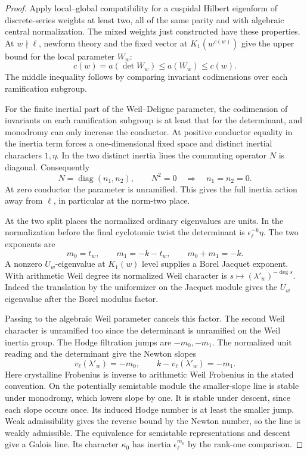 \begin{proof}
Apply local--global compatibility for a cuspidal Hilbert
eigenform of discrete-series weights at least two, all of
the same parity and with algebraic central normalization.
The mixed weights just constructed have these properties.
At \(w\nmid\ell\), newform theory and the fixed vector at
\(K_1(w^{c(w)})\) give the upper bound for the local parameter
\(W_w\):
\[
               c(w)=a(\det W_w)\le a(W_w)\le c(w).
\]
The middle inequality follows by comparing invariant
codimensions over each ramification subgroup.

For the finite inertial part of the
Weil--Deligne parameter, the codimension of invariants on
each ramification subgroup is at least that for the
determinant, and monodromy can only increase the
conductor. At positive conductor equality in the inertia
term forces a one-dimensional fixed space and distinct
inertial characters \(1,\eta\). In the two distinct inertia lines the commuting operator \(N\) is diagonal. Consequently
\[
 N=\operatorname{diag}(n_1,n_2),\qquad N^2=0
 \quad\Longrightarrow\quad n_1=n_2=0 .
\] At zero conductor
the parameter is unramified. This gives the full inertia
action away from \(\ell\), in particular at the norm-two
place.
\hfill\mbox{\cite{skinner-hilbert}}\label{cor:ordinary-mixed-hilbert-2}

At the two split places the normalized ordinary eigenvalues
are units. In the normalization before the final cyclotomic
twist the determinant is \(\epsilon_\ell^{-k}\eta\).
The two exponents are
\[
 m_0=t_w,\qquad m_1=-k-t_w,\qquad m_0+m_1=-k.
\]
A nonzero \(U_w\)-eigenvalue
at \(K_1(w)\) level supplies a Borel Jacquet exponent.
With arithmetic Weil degree its normalized Weil character is
\(s\mapsto(\lambda'_w)^{-\deg s}\). Indeed the translation
by the uniformizer on the Jacquet module gives the \(U_w\)
eigenvalue after the Borel modulus factor.

Passing to the
algebraic Weil parameter cancels this factor. The second
Weil character is unramified too since the determinant is
unramified on the Weil inertia group. The Hodge filtration
jumps are \(-m_0,-m_1\). The normalized unit reading and the determinant give the
Newton slopes
\[
        v_\ell(\lambda'_w)=-m_0,\qquad
        k-v_\ell(\lambda'_w)=-m_1 .
\]
Here crystalline Frobenius is inverse to arithmetic Weil
Frobenius in the stated convention. On the
potentially semistable module the smaller-slope line is
stable under monodromy, which lowers slope by one. It is
stable under descent, since each slope occurs once. Its
induced Hodge number is at least the smaller jump. Weak
admissibility gives the reverse bound by the Newton number,
so the line is weakly admissible. The equivalence for
semistable representations and descent give a Galois line.
Its character \(\kappa_0\) has inertia \(\epsilon_\ell^{m_0}\)
by the rank-one comparison.


\end{proof}

